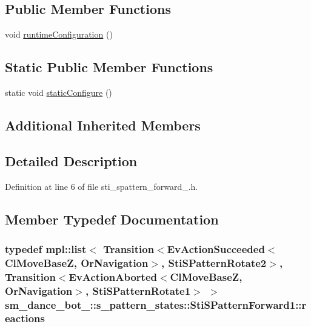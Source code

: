 \subsection*{Public Member Functions}
\begin{DoxyCompactItemize}
\item 
void \hyperlink{structsm__dance__bot__3_1_1s__pattern__states_1_1StiSPatternForward1_a91a733bb092be31302a7ddd06ebc02ed}{runtime\+Configuration} ()
\end{DoxyCompactItemize}
\subsection*{Static Public Member Functions}
\begin{DoxyCompactItemize}
\item 
static void \hyperlink{structsm__dance__bot__3_1_1s__pattern__states_1_1StiSPatternForward1_a637c8492fb227d9d7d49fb2a3281aa28}{static\+Configure} ()
\end{DoxyCompactItemize}
\subsection*{Additional Inherited Members}


\subsection{Detailed Description}


Definition at line 6 of file sti\+\_\+spattern\+\_\+forward\+\_.\+h.



\subsection{Member Typedef Documentation}
\subsubsection[{\texorpdfstring{reactions}{reactions}}]{\setlength{\rightskip}{0pt plus 5cm}typedef mpl\+::list$<$ Transition$<$Ev\+Action\+Succeeded$<${\bf Cl\+Move\+BaseZ}, {\bf Or\+Navigation}$>$, {\bf Sti\+S\+Pattern\+Rotate2}$>$, Transition$<$Ev\+Action\+Aborted$<${\bf Cl\+Move\+BaseZ}, {\bf Or\+Navigation}$>$, {\bf Sti\+S\+Pattern\+Rotate1}$>$ $>$ {\bf sm\+\_\+dance\+\_\+bot\+\_\+::s\+\_\+pattern\+\_\+states\+::\+Sti\+S\+Pattern\+Forward1\+::reactions}}\hypertarget{structsm__dance__bot__3_1_1s__pattern__states_1_1StiSPatternForward1_a120c422a7015d8eab46027d489265d06}{}\label{structsm__dance__bot__3_1_1s__pattern__states_1_1StiSPatternForward1_a120c422a7015d8eab46027d489265d06}


